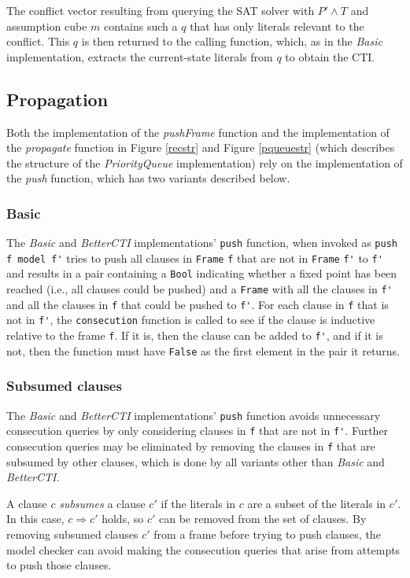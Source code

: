\documentclass[12pt,a4paper,twoside,openright]{report}
\begin{document}
{The conflict vector resulting from querying the SAT solver with $P' \wedge T$ and assumption
cube $m$ contains such a $q$ that has only literals relevant to the conflict. This $q$ is
then returned to the calling function, which, as in the \emph{Basic} implementation, extracts
the current-state literals from $q$ to obtain the CTI.


\subsection{Propagation}

Both the implementation of the {\it pushFrame} function and the implementation of the
{\it propagate} function in Figure \ref{recstr} and Figure \ref{pqueuestr} (which
describes the structure of the \emph{PriorityQueue} implementation)
rely on the implementation of the
{\it push} function, which has two variants described below.

\subsubsection{Basic}
The {\it Basic} and {\it BetterCTI} implementations' \verb,push, function,
when invoked as \verb,push f model f', tries to push all clauses in \verb,Frame, \verb,f,
that are not in \verb,Frame, \verb,f', to \verb,f', and
results in a pair containing a \verb,Bool, indicating whether a fixed point has been reached
(i.e., all clauses could be pushed) and a \verb,Frame, with all the clauses in \verb,f', and all
the clauses in \verb,f, that could be pushed to \verb,f',.
For each clause in \verb,f, that is not in \verb,f',, the \verb,consecution, function is called to
see if the clause is inductive relative to the frame \verb,f,. If it is, then
the clause can be added to \verb,f',, and if it is not, then the
function must have \verb,False, as the first element in the pair it returns.

\subsubsection{Subsumed clauses}
The \emph{Basic} and \emph{BetterCTI} implementations' \verb,push, function avoids unnecessary
consecution queries by only considering clauses in \verb,f, that are not in \verb,f',.
Further consecution queries may be eliminated by removing the clauses in \verb,f,
that are subsumed by other clauses, which is done by all variants other than {\it Basic}
and \emph{BetterCTI}.

A clause $c$ \emph{subsumes} a clause $c'$ if the literals in $c$ are a subset of the literals
in $c'$. In this case, $c \Rightarrow c'$ holds, so $c'$ can be removed from the set of clauses. By
removing subsumed clauses $c'$ from a frame before trying to push clauses, the model
checker can avoid making the consecution queries that arise from attempts to push those clauses.

}
\end{document}
